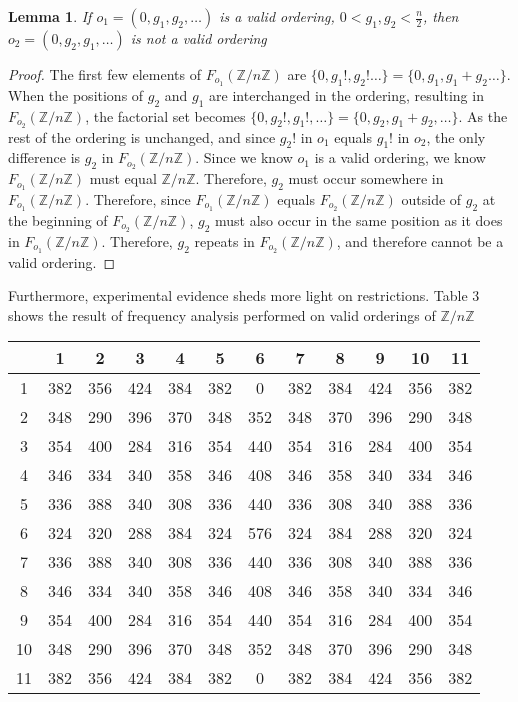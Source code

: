 \documentclass{article}
\newcommand{\ZZ}{\mathbb{Z}}
\newcommand{\ZnZ}{\ZZ/n\ZZ}
\newtheorem{lemma}{Lemma}
\begin{document}
\begin{lemma}
If $o_1 = (0, g_1, g_2, \ldots )$ is a valid ordering, $0<g_1,g_2<\frac{n}{2}$, then $o_2 = (0,g_2, g_1, \ldots)$ is not a valid ordering
\end{lemma}
\begin{proof}
The first few elements of $F_{o_1}(\ZnZ)$ are $\{0,g_1!, g_2!\ldots\} = \{0,g_1,g_1+g_2\ldots\}$. When the positions of $g_2$ and $g_1$ are interchanged in the ordering, resulting in $F_{o_2}(\ZnZ)$, the factorial set becomes $\{0,g_2!,g_1!,\ldots\} = \{0,g_2,g_1+g_2,\ldots\}$. As the rest of the ordering is unchanged, and since $g_2!$ in $o_1$ equals $g_1!$ in $o_2$, the only difference is $g_2$ in $F_{o_2}(\ZnZ)$. Since we know $o_1$ is a valid ordering, we know $F_{o_1}(\ZnZ)$ must equal $\ZnZ$. Therefore, $g_2$ must occur somewhere in $F_{o_1}(\ZnZ)$. Therefore, since $F_{o_1}(\ZnZ)$ equals $F_{o_2}(\ZnZ)$ outside of $g_2$ at the beginning of $F_{o_2}(\ZnZ)$, $g_2$ must also occur in the same position as it does in $F_{o_1}(\ZnZ)$. Therefore, $g_2$ repeats in $F_{o_2}(\ZnZ)$, and therefore cannot be a valid ordering.
\end{proof}


Furthermore, experimental evidence sheds more light on restrictions. Table 3 shows the result of frequency analysis performed on valid orderings of $\ZnZ$

\begin{center}

\begin{tabular}{|c|c|c|c|c|c|c|c|c|c|c|c|}
\hline
 &1 & 2 & 3 & 4 & 5 & 6 &7&8&9&10&11 \\
 \hline
  1 &   382& 356& 424& 384& 382& 0& 382& 384& 424& 356& 382\\
 2 &   348& 290& 396& 370& 348& 352& 348& 370& 396& 290& 348\\
 3 &   354& 400& 284& 316& 354& 440& 354& 316& 284& 400& 354\\
 4 &   346& 334& 340& 358& 346& 408& 346& 358& 340& 334& 346\\
 5 &   336& 388& 340& 308& 336& 440& 336& 308& 340& 388& 336\\
 6 &   324& 320& 288& 384& 324& 576& 324& 384& 288& 320& 324\\
 7 &   336& 388& 340& 308& 336& 440& 336& 308& 340& 388& 336\\
 8 &   346& 334& 340& 358& 346& 408& 346& 358& 340& 334& 346\\
 9 &  354& 400& 284& 316& 354& 440& 354& 316& 284& 400& 354\\
 10 & 348& 290& 396& 370& 348& 352& 348& 370& 396& 290& 348\\
 11&  382& 356& 424& 384& 382& 0& 382& 384& 424& 356& 382\\
 \hline
\end{tabular}

\end{center}
\end{document}

